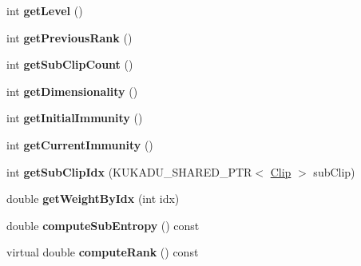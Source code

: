 \begin{DoxyCompactItemize}
\item 
\hypertarget{classkukadu_1_1Clip_ab1db78313a620ad816b9225e26bcedfe}{int {\bfseries get\-Level} ()}\label{classkukadu_1_1Clip_ab1db78313a620ad816b9225e26bcedfe}

\item 
\hypertarget{classkukadu_1_1Clip_a0588408a7fef34c3503f3c5236ea01f7}{int {\bfseries get\-Previous\-Rank} ()}\label{classkukadu_1_1Clip_a0588408a7fef34c3503f3c5236ea01f7}

\item 
\hypertarget{classkukadu_1_1Clip_af77cf93b544392ef68a2cb036073bb5c}{int {\bfseries get\-Sub\-Clip\-Count} ()}\label{classkukadu_1_1Clip_af77cf93b544392ef68a2cb036073bb5c}

\item 
\hypertarget{classkukadu_1_1Clip_abc2dd87e529d55767e168f8cc5544d51}{int {\bfseries get\-Dimensionality} ()}\label{classkukadu_1_1Clip_abc2dd87e529d55767e168f8cc5544d51}

\item 
\hypertarget{classkukadu_1_1Clip_a529397c2adfe87b4d71ff48941e9606e}{int {\bfseries get\-Initial\-Immunity} ()}\label{classkukadu_1_1Clip_a529397c2adfe87b4d71ff48941e9606e}

\item 
\hypertarget{classkukadu_1_1Clip_a70b0e249985d664605320bb8bc58b246}{int {\bfseries get\-Current\-Immunity} ()}\label{classkukadu_1_1Clip_a70b0e249985d664605320bb8bc58b246}

\item 
\hypertarget{classkukadu_1_1Clip_a47e51b76f2308a7775d9b6ceb92231a5}{int {\bfseries get\-Sub\-Clip\-Idx} (K\-U\-K\-A\-D\-U\-\_\-\-S\-H\-A\-R\-E\-D\-\_\-\-P\-T\-R$<$ \hyperlink{classkukadu_1_1Clip}{Clip} $>$ sub\-Clip)}\label{classkukadu_1_1Clip_a47e51b76f2308a7775d9b6ceb92231a5}

\item 
\hypertarget{classkukadu_1_1Clip_ae79760b863e5c56cef78a137243c33f4}{double {\bfseries get\-Weight\-By\-Idx} (int idx)}\label{classkukadu_1_1Clip_ae79760b863e5c56cef78a137243c33f4}

\item 
\hypertarget{classkukadu_1_1Clip_a05ab9806e99f04e02b8af71a5130a6bb}{double {\bfseries compute\-Sub\-Entropy} () const }\label{classkukadu_1_1Clip_a05ab9806e99f04e02b8af71a5130a6bb}

\item 
\hypertarget{classkukadu_1_1Clip_ab6d3da091cd55f6e85abf03fa31d4eac}{virtual double {\bfseries compute\-Rank} () const }\label{classkukadu_1_1Clip_ab6d3da091cd55f6e85abf03fa31d4eac}


\end{DoxyCompactItemize}
